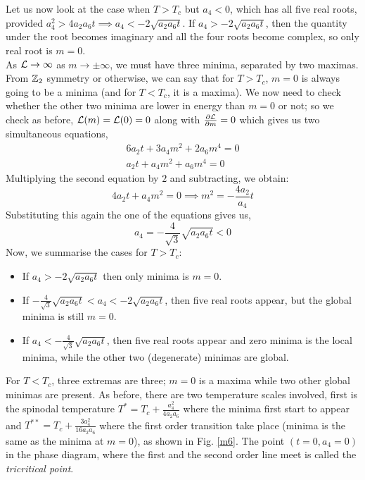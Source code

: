  \noindent
Let us now look at the case when $T>T_c$ but $a_4<0$, which has all five real roots, provided $a_4^2>4a_2a_6t\implies a_4<-2\sqrt{a_2a_6t}$. If $a_4>-2\sqrt{a_2a_6t}$, then the quantity under the root becomes imaginary and all the four roots become complex, so only real root is $m=0$.\\[0.2cm]
As $\mathcal L\to \infty$ as $m\to \pm \infty$, we must have three minima, separated by two maximas. From $\mathbb{Z}_2$ symmetry or otherwise, we can say that for $T>T_c$, $m=0$ is always going to be a minima (and for $T<T_c$,  it is a maxima). We now need to check whether the other two minima are lower in energy than $m=0$ or not; so we check as before, $\mathcal L(m) = \mathcal L(0)=0$ along with $\pdv{\mathcal L}{m}=0$ which gives us two simultaneous equations, 
\begin{equation}
    \begin{split}
        6a_2t+3a_4m^2+2a_6m^4=0\\
        a_2t +a_4m^2+a_6m^4 = 0
    \end{split}
\end{equation}
Multiplying the second equation by $2$ and subtracting, we obtain:
$$4a_2t + a_4m^2 = 0 \implies m^2 = -\frac{4a_2}{a_4}t$$
Substituting this again the one of the equations gives us, 
$$a_4 = -\frac{4}{\sqrt{3}}\sqrt{a_2a_6t}<0$$
Now, we summarise the cases for $T>T_c$:
\begin{itemize}
    \item If $a_4>-2\sqrt{a_2a_6t}$ then only minima is $m=0$.
    \item If $-\frac{4}{\sqrt{3}}\sqrt{a_2a_6t}<a_4<-2\sqrt{a_2a_6t}$, then five real roots appear, but the global minima is still $m=0$.
    \item If $a_4< -\frac{4}{\sqrt{3}}\sqrt{a_2a_6t}$, then five real roots appear and zero minima is the local minima, while the other two (degenerate) minimas are global.
\end{itemize}
For $T<T_c$, three extremas are three; $m=0$ is a maxima while two other global minimas are present. As before, there are two temperature scales involved, first is the spinodal temperature $T^* = T_c + \frac{a_4^2}{4a_2a_6}$ where the minima first start to appear and $T^{**} = T_c + \frac{3a_4^2}{16a_2 a_6}$ where the first order transition take place (minima is the same as the minima at $m=0$), as shown in Fig. \ref{m6}. The point $(t=0,a_4=0)$ in the phase diagram, where the first and the second order line meet is called the \textit{tricritical point}.